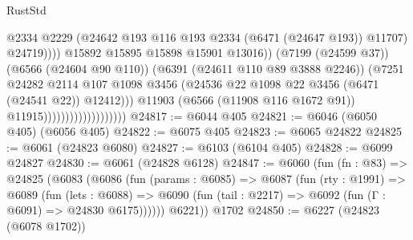 \begin{lexlean}{RustStd}
\begin{coremodule}
{\begin{coremodule}
{{{{{{{{{{{{{{{{{{{{{{{{{{                                                        @2334
                                                        @2229
                                                        (@24642
                                                          @193
                                                          @116
                                                          @193
                                                          @2334
                                                          (@6471 (@24647 @193))
                                                          @11707)
                                                        @24719))))
                                                @15892
                                                @15895
                                                @15898
                                                @15901
                                                @13016))
                                            (@7199 (@24599 @37))
                                            (@6566 (@24604 @90 @110))
                                            (@6391 (@24611 @110 @89 @3888 @2246))
                                            (@7251
                                              @24282
                                              @2114
                                              @107
                                              @1098
                                              @3456
                                              (@24536
                                                @22
                                                @1098
                                                @22
                                                @3456
                                                (@6471 (@24541 @22))
                                                @12412)))
                                          @11903
                                          (@6566 (@11908 @116 @1672 @91))
                                          @11915)))))))))))))))))))
@24817 := @6044 @405
@24821 := @6046 (@6050 @405) (@6056 @405)
@24822 := @6075 @405
@24823 := @6065 @24822
@24825 := @6061 (@24823 @6080)
@24827 := @6103 (@6104 @405)
@24828 := @6099 @24827
@24830 := @6061 (@24828 @6128)
@24847 := @6060
    (fun (fn : @83) =>
    @24825
      (@6083
        (@6086
          (fun (params : @6085) =>
          @6087
            (fun (rty : @1991) =>
            @6089
              (fun (lets : @6088) =>
              @6090 (fun (tail : @2217) => @6092 (fun (Γ : @6091) => @24830 @6175))))))
        @6221))
    @1702
@24850 := @6227 (@24823 (@6078 @1702))
}}}}}}}}}}}}}}}}}}}}}}}}}}
\end{coremodule}}
\end{coremodule}
\end{lexlean}
